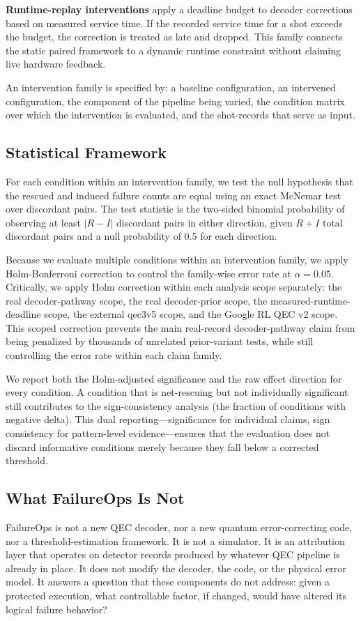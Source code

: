 \textbf{Runtime-replay interventions} apply a deadline budget to decoder corrections based on measured service time. If the recorded service time for a shot exceeds the budget, the correction is treated as late and dropped. This family connects the static paired framework to a dynamic runtime constraint without claiming live hardware feedback.

An intervention family is specified by: a baseline configuration, an intervened configuration, the component of the pipeline being varied, the condition matrix over which the intervention is evaluated, and the shot-records that serve as input.

\subsection{Statistical Framework}

For each condition within an intervention family, we test the null hypothesis that the rescued and induced failure counts are equal using an exact McNemar test over discordant pairs. The test statistic is the two-sided binomial probability of observing at least $|R - I|$ discordant pairs in either direction, given $R + I$ total discordant pairs and a null probability of 0.5 for each direction.

Because we evaluate multiple conditions within an intervention family, we apply Holm-Bonferroni correction to control the family-wise error rate at $\alpha = 0.05$. Critically, we apply Holm correction within each analysis scope separately: the real decoder-pathway scope, the real decoder-prior scope, the measured-runtime-deadline scope, the external qec3v5 scope, and the Google RL QEC v2 scope. This scoped correction prevents the main real-record decoder-pathway claim from being penalized by thousands of unrelated prior-variant tests, while still controlling the error rate within each claim family.

We report both the Holm-adjusted significance and the raw effect direction for every condition. A condition that is net-rescuing but not individually significant still contributes to the sign-consistency analysis (the fraction of conditions with negative delta). This dual reporting---significance for individual claims, sign consistency for pattern-level evidence---ensures that the evaluation does not discard informative conditions merely because they fall below a corrected threshold.

\subsection{What FailureOps Is Not}

FailureOps is not a new QEC decoder, nor a new quantum error-correcting code, nor a threshold-estimation framework. It is not a simulator. It is an attribution layer that operates on detector records produced by whatever QEC pipeline is already in place. It does not modify the decoder, the code, or the physical error model. It answers a question that these components do not address: given a protected execution, what controllable factor, if changed, would have altered its logical failure behavior?

